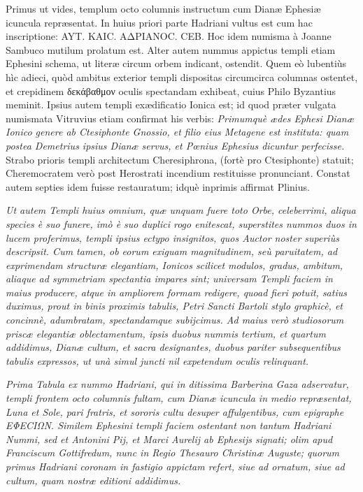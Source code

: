\documentclass[a4paper, 11pt, oneside, polutonikogreek, latin]{article}
\begin{document}
Primus ut vides, templum octo columnis instructum cum Dianæ Ephesiæ icuncula repræsentat. In huius priori parte Hadriani vultus est cum hac inscriptione: AYT. KAIC. AΔPIANOC. CEB. Hoc idem numisma à Joanne Sambuco mutilum prolatum est. Alter autem nummus appictus templi etiam Ephesini schema, ut literæ circum orbem indicant, ostendit. Quem eò lubentiùs hìc adieci, quòd ambitus exterior templi dispositas circumcirca columnas ostentet, et crepidinem δεκάβαθμον oculis spectandam exhibeat, cuius Philo Byzantius meminit. Ipsius autem templi exædificatio Ionica est; id quod præter vulgata numismata Vitruvius etiam confirmat his verbis: \emph{Primumquè ædes Ephesi Dianæ Ionico genere ab Ctesiphonte Gnossio, et filio eius Metagene est instituta: quam postea Demetrius ipsius Dianæ servus, et Pœnius Ephesius dicuntur perfecisse.} Strabo prioris templi architectum Cheresiphrona, (fortè pro Ctesiphonte) statuit; Cheremocratem verò post Herostrati incendium restituisse pronunciant. Constat autem septies idem fuisse restauratum; idquè inprimis affirmat Plinius.

\emph{Ut autem Templi huius omnium, quæ unquam fuere toto Orbe, celeberrimi, aliqua species è suo funere, imò è suo duplici rogo enitescat, superstites nummos duos in lucem proferimus, templi ipsius ectypo insignitos, quos Auctor noster superiùs descripsit. Cum tamen, ob eorum exiguam magnitudinem, seù paruitatem, ad exprimendam structuræ elegantiam, Ionicos scilicet modulos, gradus, ambitum, aliaque ad symmetriam spectantia impares sint; universam Templi faciem in maius producere, atque in ampliorem formam redigere, quoad fieri potuit, satius duximus, prout in binis proximis tabulis, Petri Sancti Bartoli stylo graphicè, et concinnè, adumbratam, spectandamque subijcimus. Ad maius verò studiosorum priscæ elegantiæ oblectamentum, ipsis duobus nummis tertium, et quartum addidimus, Dianæ cultum, et sacra designantes, duobus pariter subsequentibus tabulis expressos, ut unà simul juncti nil expetendum oculis relinquant.}

\emph{Prima Tabula ex nummo Hadriani, qui in ditissima Barberina Gaza adservatur, templi frontem octo columnis fultam, cum Dianæ icuncula in medio repræsentat, Luna et Sole, pari fratris, et sororis cultu desuper affulgentibus, cum epigraphe EΦECIΩN. Similem Ephesini templi faciem ostentant non tantum Hadriani Nummi, sed et Antonini Pij, et Marci Aurelij ab Ephesijs signati; olim apud Franciscum Gottifredum, nunc in Regio Thesauro Christinæ Auguste; quorum primus Hadriani coronam in fastigio appictam refert, siue ad ornatum, siue ad cultum, quam nostræ editioni addidimus.}
\end{document}
